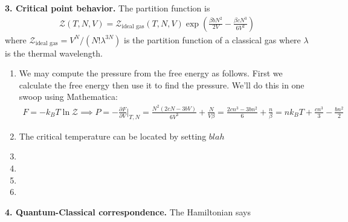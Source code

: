 \documentclass{article}
\theoremstyle{definition}
\newcommand{\p}{\partial}
\newcommand{\be}{\beta}
\newcommand{\f}[2]{\frac{#1}{#2}}
\newcommand{\lp}{\left(}
\newcommand{\rp}{\right)}
\begin{document}
\noindent \textbf{3. Critical point behavior.} The partition function is 
\begin{align*}
\mathcal{Z}(T,N,V) = \mathcal{Z}_\text{ideal gas}(T,N,V) \exp\lp \f{\be b N^2}{2V} - \f{\be c N^3}{6V^2} \rp
\end{align*}
where $\mathcal{Z}_\text{ideal gas} = V^N/(N! \lambda^{3N})$ is the partition function of a classical gas where $\lambda$ is the thermal wavelength. 

\begin{enumerate}[label=(\alph*)]
	\item We may compute the pressure from the free energy as follows. First we calculate the free energy then use it to find the pressure. We'll do this in one swoop using Mathematica:
	\begin{align*}
	F = -k_BT \ln \mathcal{Z} \implies \boxed{P} = -\f{\p F}{\p V}\bigg\vert_{T,N} = {\f{N^2(2cN - 3bV)}{6V^3} + \f{N}{V\be}} = \f{2cn^3 - 3bn^2}{6} + \f{n}{\be} = \boxed{nk_BT + \f{cn^3}{3} - \f{b n^2}{2}}
	\end{align*}
	
	
	\item The critical temperature can be located by setting $blah$
	\item 
	\item 
	\item 
	\item
\end{enumerate}

\noindent \textbf{4. Quantum-Classical correspondence.} The Hamiltonian says 
\end{document}
